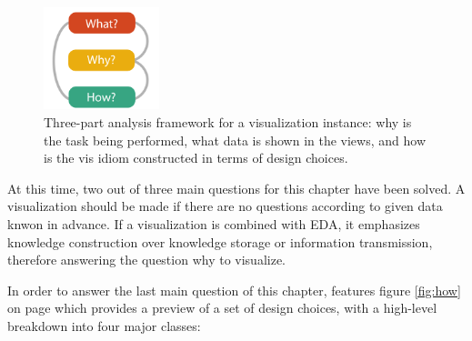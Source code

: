 \begin{figure}[!htb]
\centering
\includegraphics[width=0.3\textwidth,keepaspectratio]{images/basics/analysis-framework.png}
\caption[
    Three-part analysis framework for a visualization instance: why is the task being performed, what data is shown in the views, and how is the vis idiom constructed in terms of design choices .
]{Three-part analysis framework for a visualization instance: why is the task being performed, what data is shown in the views, and how is the vis idiom constructed in terms of design choices.}
\label{fig:an-framework}
\end{figure}

At this time, two out of three main questions for this chapter have been solved. A visualization should be made if there are no questions according to given data knwon in advance. If a visualization is combined with \ac{EDA}, it emphasizes knowledge construction over knowledge storage or information transmission, therefore answering the question why to visualize.

In order to answer the last main question of this chapter, \citeauthor{Munzner2014} features figure \ref{fig:how} on page \pageref{fig:how} which provides a preview of a set of design choices, with a high-level breakdown into four major classes:

